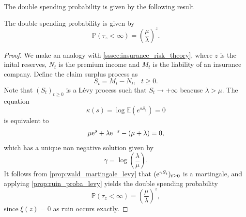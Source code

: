 The double spending probability is given by the following result
\begin{theo}\label{theo:ds_probability_Poisson_process}
The double spending probability is given by 
$$
\mathbb{P}(\tau_z < \infty) = \left(\frac{\mu}{\lambda}\right)^z.
$$
\end{theo}
\begin{proof}
We make an analogy with \cref{sssec:insurance_risk_theory}, where $z$ is the inital reserves, $N_t$ is the premium income and $M_t$ is the liability of an insurance company. Define the claim surplus process as 
$$
S_t = M_t - N_t,\text{ }t\geq0.
$$
Note that $(S_t)_{t\geq0}$ is a L\'evy process such that $S_t\rightarrow + \infty$ beacuse $\lambda >\mu$. The equation 
$$
\kappa(s) =\log\mathbb{E}\left(e^{s S_1}\right) = 0
$$
is equivalent to 
$$
\mu \mathrm{e}^s + \lambda \mathrm{e}^{-s}- (\mu+\lambda) =0,
$$
which has a unique non negative solution given by 
$$
\gamma = \log\left(\frac{\lambda}{\mu}\right).
$$
It follows from \cref{prop:wald_martingale_levy} that $(\mathrm{e}^{\gamma S_t})_{t\geq 0}$ is a martingale, and applying \cref{prop:ruin_proba_levy} yields the double spending probability 
$$
\mathbb{P}(\tau_z<\infty) = \left(\frac{\mu}{\lambda}\right)^z,
$$
since $\xi(z)=0$ as ruin occurs exactly.
\end{proof}
